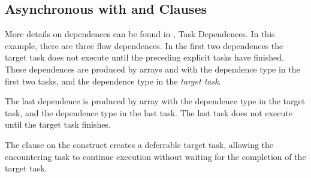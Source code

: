 \subsection{Asynchronous  with  and  Clauses}
\label{subsec:async_target_nowait_depend}

More details on dependences can be found in , Task 
Dependences. In this example, there are three flow dependences.  In the first two dependences the
target task does not execute until the preceding explicit tasks have finished.   These 
dependences are produced by arrays  and   with the  dependence type in the first two tasks, and the  dependence type in the \emph{target task}.   

The last dependence is produced by array   with the  dependence type in the target task, and the  dependence type in the last task.  The last task does not execute until the target task finishes.  

The  clause on the  construct creates a deferrable target task, allowing the encountering task to continue execution without waiting for the completion of the target task.



